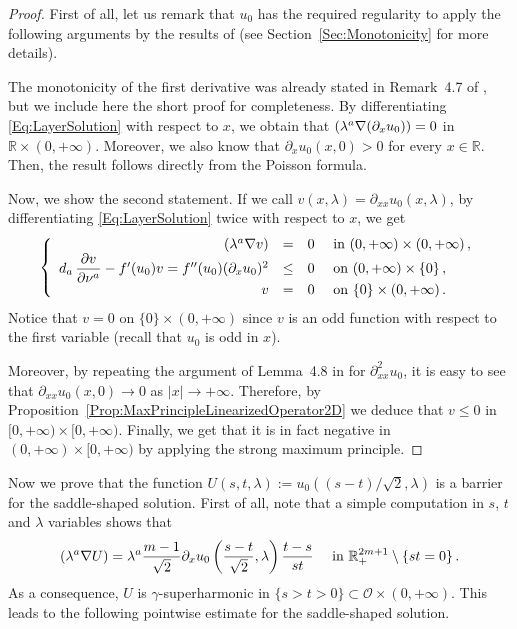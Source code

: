 \documentclass[12pt,reqno]{amsart}
\theoremstyle{definition}
\theoremstyle{remark}
\newcommand{\con}[1]{\mathbb{#1}}
\newcommand{\R}{\con{R}} %
\newcommand{\ocal}{\mathcal{O}}
\newcommand{\s}{\gamma}
\newcommand{\bpar}[1]{\left ( {#1}\right )}
\newcommand\beqc[1]{\left\{\begin{array}{#1}}
\newcommand\eeqc{\end{array} \right.}
\def\PDEsystem{rcll}
\let\div\relax
\DeclareMathOperator{\div}{div}
\numberwithin{equation}{section}
\begin{document}
\begin{proof}
First of all, let us remark that $u_0$ has the required regularity to apply the following arguments by the results of \cite{CabreSireI} (see Section~\ref{Sec:Monotonicity} for more details).


The monotonicity of the first derivative was already stated in Remark~4.7 of \cite{CabreSireI}, but we include here the short proof for completeness. By differentiating \eqref{Eq:LayerSolution} with respect to $x$, we obtain that $\div(\lambda^a \nabla (\partial_x u_0)) = 0$ in $\R\times (0,+\infty)$. Moreover, we also know that $\partial_x u_0(x,0) > 0$ for every $x\in \R$. Then, the result follows directly from the Poisson formula.

Now, we show the second statement. If we call $v(x,\lambda) = \partial_{xx} u_0(x,\lambda)$, by differentiating \eqref{Eq:LayerSolution} twice with respect to $x$, we get
\begin{equation*}
\beqc{\PDEsystem}
\div(\lambda^a \nabla v) &=& 0 & \text{ in } (0,+\infty)\times (0,+\infty) \,, \\
d_a\,\dfrac{\partial v}{\partial \nu^a} - f'(u_0) v = f''(u_0) (\partial_x u_0) ^2 &\leq & 0 & \text{ on } (0,+\infty) \times \{0\} \,, \\
v & = & 0 & \text{ on } \{0\} \times (0,+\infty)\,.
\eeqc
\end{equation*}
Notice that $v = 0$ on $\{0\} \times (0,+\infty)$ since $v$ is an odd function with respect to the first variable (recall that $u_0$ is odd in $x$).

Moreover, by repeating the argument of Lemma~4.8 in \cite{CabreSireI} for $\partial^2_{xx} u_0$, it is easy to see that $\partial_{xx} u_0(x,0) \to 0$ as $|x|\to +\infty$. Therefore, by Proposition~\ref{Prop:MaxPrincipleLinearizedOperator2D} we deduce that $v\leq 0$ in $[0,+\infty)\times [0,+\infty)$. Finally, we get that it is in fact negative in $(0,+\infty)\times [0,+\infty)$ by applying the strong maximum principle.
\end{proof}

Now we prove that the function $U(s,t,\lambda) := u_0 ( (s-t)/\sqrt{2}, \lambda)$ is a barrier for the saddle-shaped solution. First of all, note that a simple computation in $s$, $t$ and $\lambda$ variables shows that
\begin{equation}
\label{Eq:EqForULayer}
\div (\lambda^a \nabla U) = \lambda^a \dfrac{m-1}{\sqrt{2}} \partial_x u_0 \bpar{\dfrac{s-t}{\sqrt{2}}, \lambda} \dfrac{t-s}{st} \quad \text{ in } \R^{2m + 1}_+ \setminus \{st=0\}\,.
\end{equation}
As a consequence, $U$ is $\s$-superharmonic in $\{s>t>0\} \subset \ocal \times (0, +\infty)$. This leads to the following pointwise estimate for the saddle-shaped solution.
\end{document}
